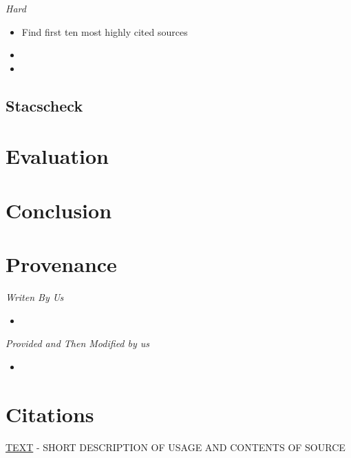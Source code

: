 \documentclass[12pt,a4paper,final]{article}
\begin{document}
\begin{center} \emph{Hard} \end{center}
\begin{itemize}[noitemsep]
    \item Find first ten most highly cited sources
    \item
    \item
\end{itemize}

\subsection*{Stacscheck}

\section*{Evaluation}

\section*{Conclusion}

\section*{Provenance}

\begin{center} \emph{Writen By Us} \end{center}
\begin{itemize}[noitemsep]
    \item
\end{itemize}

\begin{center} \emph{Provided and Then Modified by us} \end{center}
\begin{itemize}[noitemsep]
	\item
\end{itemize}


\section*{Citations}

\noindent
\href{HYPERLINK}{TEXT}
\newline - SHORT DESCRIPTION OF USAGE AND CONTENTS OF SOURCE
\end{document}
